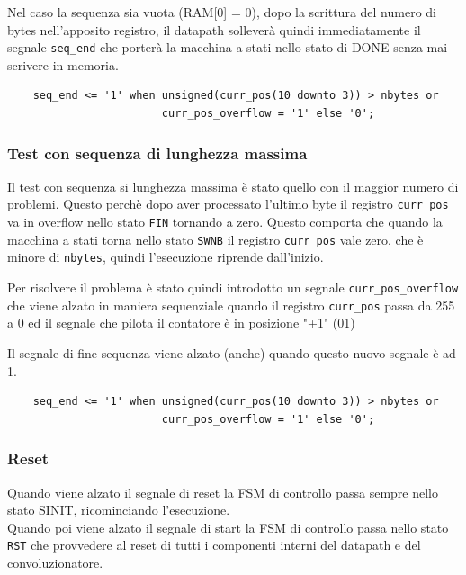 \documentclass[12pt, a4paper]{article}
\begin{document}
Nel caso la sequenza sia vuota (RAM[0] = 0), dopo la scrittura del numero di bytes nell'apposito registro,
il datapath solleverà quindi immediatamente il segnale \texttt{seq\_end} che porterà la macchina a stati
nello stato di DONE senza mai scrivere in memoria.

\begin{verbatim}
    seq_end <= '1' when unsigned(curr_pos(10 downto 3)) > nbytes or 
                        curr_pos_overflow = '1' else '0';
\end{verbatim}


\subsubsection{Test con sequenza di lunghezza massima}

Il test con sequenza si lunghezza massima è stato quello con il maggior numero di problemi.
Questo perchè dopo aver processato l'ultimo byte il registro \texttt{curr\_pos} va in overflow
nello stato \texttt{FIN} tornando a zero.
\noindent Questo comporta che quando la macchina a stati torna nello stato \texttt{SWNB} il registro \texttt{curr\_pos} 
vale zero, che è minore di \texttt{nbytes}, quindi l'esecuzione riprende dall'inizio.

\noindent Per risolvere il problema è stato quindi introdotto un segnale \texttt{curr\_pos\_overflow} che viene alzato in maniera sequenziale
quando il registro \texttt{curr\_pos} passa da 255 a 0 ed il segnale che pilota il contatore è in posizione "+1" (01)

\noindent Il segnale di fine sequenza viene alzato (anche) quando questo nuovo segnale è ad 1.

\begin{verbatim}
    seq_end <= '1' when unsigned(curr_pos(10 downto 3)) > nbytes or 
                        curr_pos_overflow = '1' else '0';
\end{verbatim}


\subsubsection{Reset}

Quando viene alzato il segnale di reset la FSM di controllo passa sempre nello stato SINIT, ricominciando l'esecuzione.\\
\noindent Quando poi viene alzato il segnale di start la FSM di controllo passa nello stato \texttt{RST}
che provvedere al reset di tutti i componenti interni del datapath e del convoluzionatore.
\end{document}
